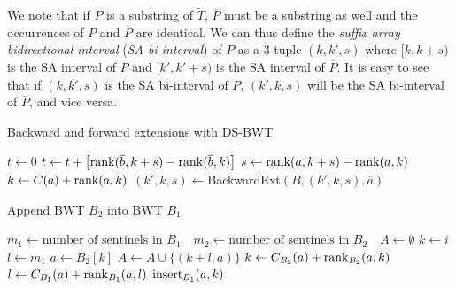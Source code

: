 \documentclass[webpdf,contemporary,large,namedate]{oup-authoring-template}%
\begin{document}
We note that if $P$ is a substring of $\tilde{T}$,
$\overline{P}$ must be a substring as well and the occurrences of $P$ and $\overline{P}$ are identical.
We can thus define the \emph{suffix array bidirectional interval} (\emph{SA bi-interval}) of $P$
as a 3-tuple $(k,k',s)$ where $[k,k+s)$ is the SA interval of $P$ and $[k',k'+s)$ is the SA interval of $\overline{P}$.
It is easy to see that if $(k,k',s)$ is the SA bi-interval of $P$, $(k',k,s)$ will be the SA bi-interval of $\overline{P}$, and vice versa.

\begin{algorithm}[!htb]
	\caption{Backward and forward extensions with DS-BWT}
	\begin{algorithmic}[1]
			\State $t\gets 0$
				\State $t\gets t+\big[{\rm rank}(\overline{b},k+s)-{\rm rank}(\overline{b},k)\big]$
			\EndFor
			\State $s\gets {\rm rank}(a,k+s)-{\rm rank}(a,k)$
			\State $k\gets C(a)+{\rm rank}(a,k)$
			\State {}
		\EndProcedure
			\State $(k',k,s)\gets${\sc BackwardExt}$(B,(k',k,s),\overline{a})$
			\State {}
		\EndProcedure
	\end{algorithmic}
\end{algorithm}

\begin{algorithm}[!htb]
	\caption{Append BWT $B_2$ into BWT $B_1$}\label{algo:merge}
	\begin{algorithmic}[1]
			\State $m_1\gets\mbox{number of sentinels in $B_1$ }$
			\State $m_2\gets\mbox{number of sentinels in $B_2$ }$
			\State $A\gets \emptyset$
				\State $k\gets i$
				\State $l\gets m_1$
				\Repeat
					\State $a\gets B_2[k]$
					\State $A\gets A\cup \{(k+l,a)\}$
					\State $k\gets C_{B_2}(a)+{\rm rank}_{B_2}(a,k)$
					\State $l\gets C_{B_1}(a)+{\rm rank}_{B_1}(a,l)$
			\EndFor
				\State ${\rm insert}_{B_1}(a,k)$
			\EndFor
		\EndProcedure
	\end{algorithmic}
\end{algorithm}
\end{document}

